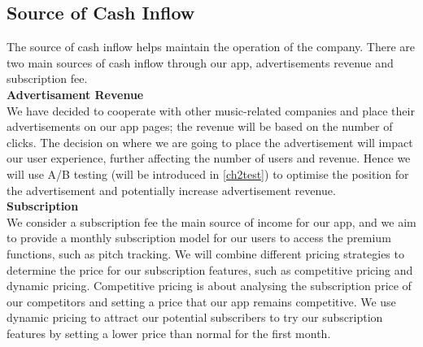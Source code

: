 \subsection{Source of Cash Inflow}
\label{Source of Cash Inflow}
The source of cash inflow helps maintain the operation of the company.  There are two main sources of cash inflow through our app, advertisements revenue and subscription fee. 
\\ \textbf{Advertisament Revenue}
\\ We have decided to cooperate with other music-related companies and place their advertisements on our app pages; the revenue will be based on the number of clicks. The decision on where we are going to place the advertisement will impact our user experience, further affecting the number of users and revenue. Hence we will use A/B testing (will be introduced in \cref{ch2test}) to optimise the position for the advertisement and potentially increase advertisement revenue.
\\ \textbf{Subscription}
\\We consider a subscription fee the main source of income for our app, and we aim to provide a monthly subscription model for our users to access the premium functions, such as pitch tracking. We will combine different pricing strategies to determine the price for our subscription features, such as competitive pricing and dynamic pricing. Competitive pricing is about analysing the subscription price of our competitors and setting a price that our app remains competitive. We use dynamic pricing to attract our potential subscribers to try our subscription features by setting a lower price than normal for the first month.

